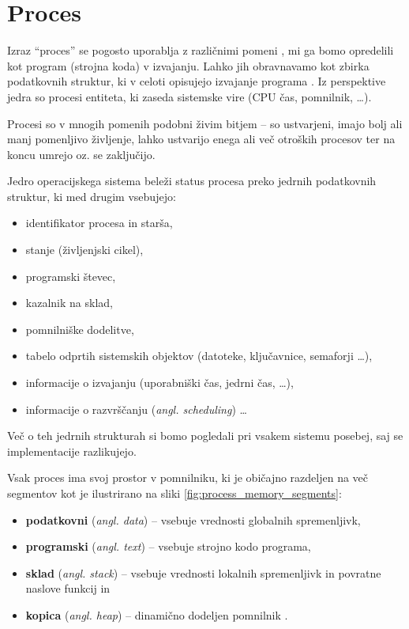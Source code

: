 \documentclass[a4paper,12pt,openright]{book}
\begin{document}
\section{Proces}

Izraz ``proces'' se pogosto uporablja z različnimi pomeni \cite{Bovet_Cesati_2005}, mi ga bomo opredelili kot program (strojna koda) v izvajanju.
Lahko jih obravnavamo kot zbirka podatkovnih struktur, ki v celoti opisujejo izvajanje programa \cite{Bovet_Cesati_2005}.
Iz perspektive jedra so procesi entiteta, ki zaseda sistemske vire (CPU čas, pomnilnik, \dots).

Procesi so v mnogih pomenih podobni živim bitjem -- so ustvarjeni, imajo bolj ali manj pomenljivo življenje, lahko ustvarijo enega ali več otroških procesov ter na koncu umrejo oz. se zaključijo.

Jedro operacijskega sistema beleži status procesa preko jedrnih podatkovnih struktur, ki med drugim vsebujejo:
\begin{itemize}
	\item identifikator procesa in starša,
	\item stanje (življenjski cikel),
	\item programski števec,
	\item kazalnik na sklad,
	\item pomnilniške dodelitve,
	\item tabelo odprtih sistemskih objektov (datoteke, ključavnice, semaforji \dots),
	\item informacije o izvajanju (uporabniški čas, jedrni čas, \dots),
	\item informacije o razvrščanju (\textit{angl. scheduling}) \dots
\end{itemize}
Več o teh jedrnih strukturah si bomo pogledali pri vsakem sistemu posebej, saj se implementacije razlikujejo.

Vsak proces ima svoj prostor v pomnilniku, ki je običajno razdeljen na več segmentov kot je ilustrirano na sliki \ref{fig:process_memory_segments}:
\begin{itemize}
	\item \textbf{podatkovni} (\textit{angl. data}) -- vsebuje vrednosti globalnih spremenljivk,
	\item \textbf{programski} (\textit{angl. text}) -- vsebuje strojno kodo programa,
	\item \textbf{sklad} (\textit{angl. stack}) -- vsebuje vrednosti lokalnih spremenljivk in povratne naslove funkcij in
	\item \textbf{kopica} (\textit{angl. heap}) -- dinamično dodeljen pomnilnik \cite{Silberschatz_Galvin_Gagne_2018}.
\end{itemize}
\end{document}
